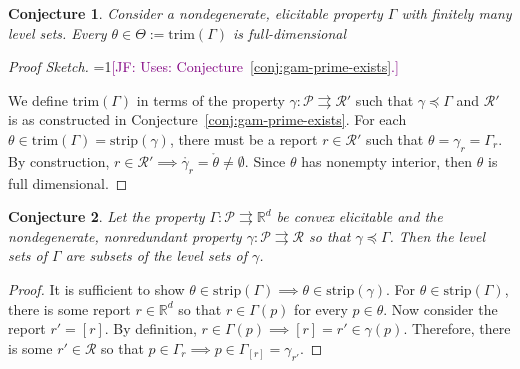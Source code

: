 \documentclass[12pt]{article}
\newcommand{\Comments}{1}
\newcommand{\mynote}[2]{\ifnum\Comments=1\textcolor{#1}{#2}\fi}
\newcommand{\jessie}[1]{\mynote{purple}{[JF: #1]}}
\newcommand{\reals}{\mathbb{R}}
\renewcommand{\P}{\mathcal{P}}
\newcommand{\R}{\mathcal{R}}
\newcommand{\inter}[1]{\mathring{#1}}%
\newcommand{\toto}{\rightrightarrows}
\newcommand{\trim}{\mathrm{trim}}
\newcommand{\strip}{\mathrm{strip}}
\newtheorem{conjecture}{Conjecture}
\begin{document}
\begin{conjecture}\label{conj:trim-full-dim}
	Consider a nondegenerate, elicitable property $\Gamma$ with finitely many level sets.
	Every $\theta \in \Theta := \trim(\Gamma)$ is full-dimensional  
\end{conjecture}

\begin{proof}[Proof Sketch]
	\jessie{Uses: Conjecture~\ref{conj:gam-prime-exists}.}
	
	We define $\trim(\Gamma)$ in terms of the property $\gamma: \P \toto \R'$ such that $\gamma \preceq \Gamma$ and $\R'$ is as constructed in Conjecture~\ref{conj:gam-prime-exists}.
	For each $\theta \in \trim(\Gamma) = \strip(\gamma)$, there must be a report $r \in \R'$ such that $\theta = \gamma_r = \Gamma_{r}$.
	By construction, $r \in \R' \implies \inter{\gamma_r} = \inter{\theta} \neq \emptyset$.
	Since $\theta$ has nonempty interior, then $\theta$ is full dimensional. 
	
\end{proof}


\begin{conjecture}\label{conj:lev-sets-subsets}
	Let the property $\Gamma: \P \toto \reals^d$ be convex elicitable and the nondegenerate, nonredundant property $\gamma: \P \toto \R$ so that $\gamma \preceq \Gamma$.
	Then the level sets of $\Gamma$ are subsets of the level sets of $\gamma$.
\end{conjecture}

\begin{proof}
	It is sufficient to show $\theta \in \strip(\Gamma) \implies \theta \in \strip(\gamma)$.
	For $\theta \in \strip(\Gamma)$, there is some report $r \in \reals^d$ so that $r \in \Gamma(p)$ for every $p \in \theta$.
	Now consider the report $r' = [r]$.
	By definition, $r \in \Gamma(p) \implies [r] = r' \in \gamma(p)$.
	Therefore, there is some $r' \in \R$ so that $p \in \Gamma_r \implies p \in \Gamma_{[r]} = \gamma_{r'}$.
%	
\end{proof}
\end{document}
